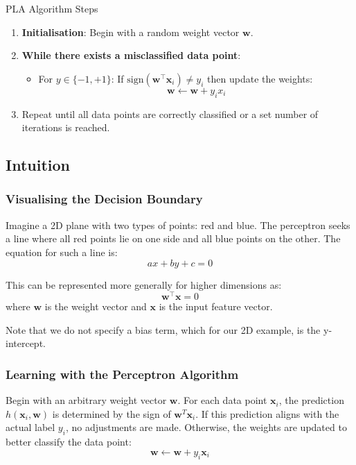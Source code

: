 \begin{definitionbox}{PLA Algorithm Steps}
    \begin{enumerate}
    \item \textbf{Initialisation}: Begin with a random weight vector \( \mathbf{w} \).
    \item \textbf{While there exists a misclassified data point}: 
    \begin{itemize}
        \item For \( y \in \{-1, +1\} \): If \( \text{sign}(\mathbf{w}^\top \textbf{x} _i) \neq y_i \) then update the weights:
        \[
        \mathbf{w} \leftarrow \mathbf{w} + y_i x_i
        \]

    \end{itemize}
    \item Repeat until all data points are correctly classified or a set number of iterations is reached.
\end{enumerate}

\end{definitionbox}



\subsection{Intuition}
\subsubsection{Visualising the Decision Boundary}
Imagine a 2D plane with two types of points: red and blue. The perceptron seeks a line where all red points lie on one side and all blue points on the other. The equation for such a line is:
\[ ax + by + c = 0 \]

\noindent
This can be represented more generally for higher dimensions as:
\[ \mathbf{w}^\top\mathbf{x} = 0 \]
where $\mathbf{w}$ is the weight vector and $\mathbf{x}$ is the input feature vector.


\noindent
Note that we do not specify a bias term, which for our 2D example, is the y-intercept.

\subsubsection{Learning with the Perceptron Algorithm}
Begin with an arbitrary weight vector $\mathbf{w}$. For each data point $\mathbf{x}_i$, the prediction $h(\mathbf{x}_i, \mathbf{w})$ is determined by the sign of $\mathbf{w}^T\mathbf{x}_i$. If this prediction aligns with the actual label $y_i$, no adjustments are made. Otherwise, the weights are updated to better classify the data point:
\[ \mathbf{w} \leftarrow \mathbf{w} + y_i\mathbf{x}_i \]

